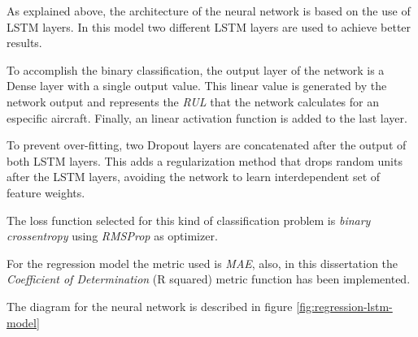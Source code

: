 As explained above, the architecture of the neural network is based on the use of LSTM layers. In this model two different LSTM layers are used to achieve better results.

To accomplish the binary classification, the output layer of the network is a Dense layer with a single output value. This linear value is generated by the network output and represents the \textit{RUL} that the network calculates for an especific aircraft. Finally, an linear activation function is added to the last layer.

To prevent over-fitting, two Dropout layers are concatenated after the output of both LSTM layers. This adds a regularization method that drops random units after the LSTM layers, avoiding the network to learn interdependent set of feature weights.

The loss function selected for this kind of classification problem is \textit{binary crossentropy} using \textit{RMSProp} as optimizer.

For the regression model the metric used is \textit{MAE}, also, in this dissertation the \textit{Coefficient of Determination} (R squared) metric function has been implemented.

The diagram for the neural network is described in figure \ref{fig:regression-lstm-model}

